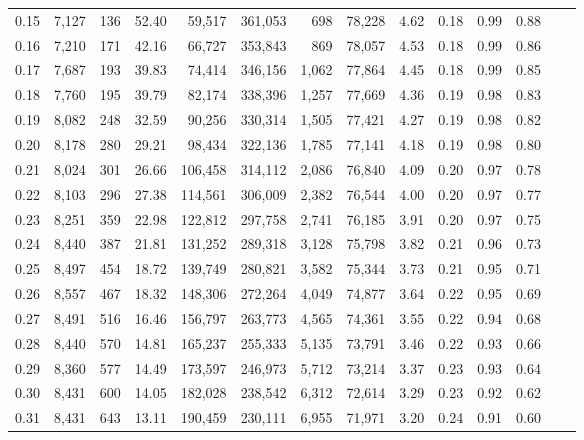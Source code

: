 \begin{tabular}{rrrrrrrrrrrrrr}
0.15 &  7,127 &    136 &   52.40 &   59,517 &  361,053 &     698 &  78,228 &  4.62 &  0.18 &  0.99 &      0.88 \\
0.16 &  7,210 &    171 &   42.16 &   66,727 &  353,843 &     869 &  78,057 &  4.53 &  0.18 &  0.99 &      0.86 \\
0.17 &  7,687 &    193 &   39.83 &   74,414 &  346,156 &   1,062 &  77,864 &  4.45 &  0.18 &  0.99 &      0.85 \\
0.18 &  7,760 &    195 &   39.79 &   82,174 &  338,396 &   1,257 &  77,669 &  4.36 &  0.19 &  0.98 &      0.83 \\
0.19 &  8,082 &    248 &   32.59 &   90,256 &  330,314 &   1,505 &  77,421 &  4.27 &  0.19 &  0.98 &      0.82 \\
0.20 &  8,178 &    280 &   29.21 &   98,434 &  322,136 &   1,785 &  77,141 &  4.18 &  0.19 &  0.98 &      0.80 \\
0.21 &  8,024 &    301 &   26.66 &  106,458 &  314,112 &   2,086 &  76,840 &  4.09 &  0.20 &  0.97 &      0.78 \\
0.22 &  8,103 &    296 &   27.38 &  114,561 &  306,009 &   2,382 &  76,544 &  4.00 &  0.20 &  0.97 &      0.77 \\
0.23 &  8,251 &    359 &   22.98 &  122,812 &  297,758 &   2,741 &  76,185 &  3.91 &  0.20 &  0.97 &      0.75 \\
0.24 &  8,440 &    387 &   21.81 &  131,252 &  289,318 &   3,128 &  75,798 &  3.82 &  0.21 &  0.96 &      0.73 \\
0.25 &  8,497 &    454 &   18.72 &  139,749 &  280,821 &   3,582 &  75,344 &  3.73 &  0.21 &  0.95 &      0.71 \\
0.26 &  8,557 &    467 &   18.32 &  148,306 &  272,264 &   4,049 &  74,877 &  3.64 &  0.22 &  0.95 &      0.69 \\
0.27 &  8,491 &    516 &   16.46 &  156,797 &  263,773 &   4,565 &  74,361 &  3.55 &  0.22 &  0.94 &      0.68 \\
0.28 &  8,440 &    570 &   14.81 &  165,237 &  255,333 &   5,135 &  73,791 &  3.46 &  0.22 &  0.93 &      0.66 \\
0.29 &  8,360 &    577 &   14.49 &  173,597 &  246,973 &   5,712 &  73,214 &  3.37 &  0.23 &  0.93 &      0.64 \\
0.30 &  8,431 &    600 &   14.05 &  182,028 &  238,542 &   6,312 &  72,614 &  3.29 &  0.23 &  0.92 &      0.62 \\
0.31 &  8,431 &    643 &   13.11 &  190,459 &  230,111 &   6,955 &  71,971 &  3.20 &  0.24 &  0.91 &      0.60 \\

\end{tabular}
